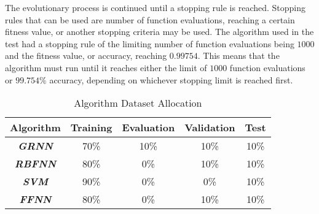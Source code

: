 \documentclass[conference]{IEEEtran}
\begin{document}

The evolutionary process is continued until a stopping rule is reached. Stopping rules that can be used are number of function evaluations, reaching a certain fitness value, or another stopping criteria may be used. The algorithm used in the test had a stopping rule of the limiting number of function evaluations being \begin{math}1000\end{math} and the fitness value, or accuracy, reaching \begin{math}0.99754\end{math}. This means that the algorithm must run until it reaches either the limit of \begin{math}1000\end{math} function evaluations or \begin{math}99.754\%\end{math} accuracy, depending on whichever stopping limit is reached first.  



\begin{table}[ht]
\caption{Algorithm Dataset Allocation}
\def\arraystretch{1.1}
\begin{center}
\begin{tabular}{|c|c|c|c|c|}
\hline
\textbf{Algorithm} & \textbf{Training} & \textbf{Evaluation} & \textbf{Validation} & \textbf{Test} \\
\hline
\textbf{\textit{GRNN}} & 70\% & 10\% & 10\% & 10\% \\
\textbf{\textit{RBFNN}} & 80\% & 0\% & 10\% & 10\% \\
\textbf{\textit{SVM}} & 90\% & 0\% & 0\% & 10\% \\
\textbf{\textit{FFNN}} & 80\% & 0\% & 10\% & 10\% \\
\hline
\end{tabular}
\label{table:Algorithm_Dataset Allocation_Summary}
\end{center}
\end{table}
\end{document}
